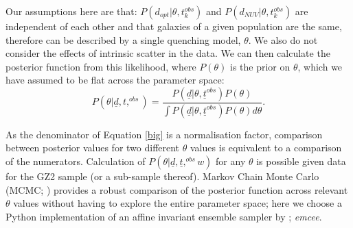 \documentclass{mn2e}
\begin{document}
Our assumptions here are that: $P(d_{opt}|\theta, t^{obs}_{k})$ and $P(d_{NUV}|\theta, t^{obs}_{k})$ are independent of each other and that galaxies of a given population are the same, therefore can be described by a single quenching model, $\theta$. We also do not consider the effects of intrinsic scatter in the data.
%
We can then calculate the posterior function from this likelihood, where $P(\theta)$ is the prior on $\theta$, which we have assumed to be flat across the parameter space:
\begin{equation}\label{big}
P(\theta|\underline{d}, t,^{obs}) = \frac{P(\underline{d}|\theta, \underline{t}^{obs})P(\theta)}{\int P(\underline{d}|\theta, \underline{t}^{obs})P(\theta) d\theta}.
\end{equation}


As the denominator of Equation \ref{big} is a normalisation factor, comparison between posterior values for two different  $\theta$ values is equivalent to a comparison of the numerators. Calculation of $P(\theta|\underline{d}, \underline{t},^{obs} w)$  for any $\theta$ is possible given data for the GZ2 sample (or a sub-sample thereof). Markov Chain Monte Carlo (MCMC; \citealt{MacKay, Dan, GW10}) provides a robust comparison of the posterior function across relevant $\theta$ values without having to explore the entire parameter space; here we choose a Python implementation of an affine invariant ensemble sampler by \cite{Dan}; \emph{emcee}.
\end{document}

